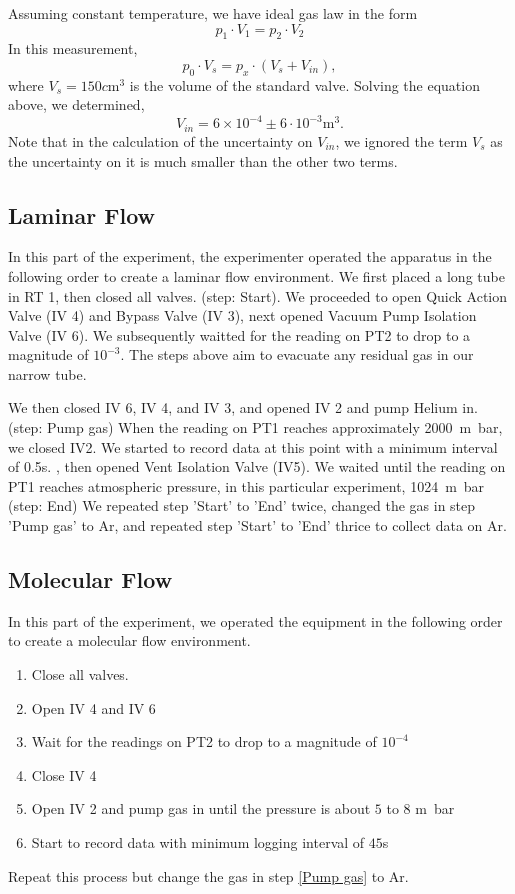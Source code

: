 \documentclass[12pt,a4paper]{article}
\begin{document}
	Assuming constant temperature, we have ideal gas law in the form\\
	\begin{equation*}
		p_1 \cdot V_1 = p_2 \cdot V_2
	\end{equation*}
	In this measurement,\\
	\begin{equation*}
		p_0 \cdot V_s = p_x \cdot (V_s+V_{in}),
	\end{equation*}
	where $V_s=150 \si{c\metre^3}$ is the volume of the standard valve.
	Solving the equation above, we determined, 
	$$V_{in}= 6 \times 10 ^{-4} \pm 6 \cdot 10^{-3} \si{\metre^3}.$$
	Note that in the calculation of the uncertainty on $V_{in}$, we ignored the term $V_s$ as the uncertainty on it is much smaller than the other two terms.
	\clearpage
	\subsection{Laminar Flow}		
	In this part of the experiment, the experimenter operated the apparatus in the following order to create a laminar flow environment.
	We first placed a long tube in RT 1, then closed all valves.
	(step: Start). 
	We proceeded to open Quick Action Valve (IV 4) and Bypass Valve (IV 3), next opened Vacuum Pump Isolation Valve (IV 6). We subsequently waitted for the reading on PT2 to drop to a magnitude of $10^{-3}$. The steps above aim to evacuate any residual gas in our narrow tube.
		
	We then closed IV 6, IV 4, and IV 3, and opened IV 2 and pump Helium in. 
	(step: Pump gas)
	When the reading on PT1 reaches approximately \SI{2000}{m\bar}, we closed IV2. We started to record data at this point with a minimum interval of 0.5s.
		, then opened Vent Isolation Valve (IV5). We waited until the reading on PT1 reaches atmospheric pressure, in this particular experiment, \SI{1024}{m\bar} 
	(step: End)
	We repeated step 'Start' to 'End' twice, changed the gas in step 'Pump gas' to Ar, and repeated step 'Start' to 'End' thrice to collect data on Ar.
	\subsection{Molecular Flow}	
	In this part of the experiment, we operated the equipment in the following order to create a molecular flow environment.
	\begin{enumerate}
		\item Close all valves.
		\item Open IV 4 and IV 6
		\item Wait for the readings on PT2 to drop to a magnitude of $10^{-4}$
		\item Close IV 4
		\item Open IV 2 and pump gas in until the pressure is about $5$ to $8$ \si{m\bar}\label{Pump gas}
		\item Start to record data with minimum logging interval of  $45$\si{\second}
	\end{enumerate}
	Repeat this process but change the gas in step \ref{Pump gas} to Ar.
\end{document}
